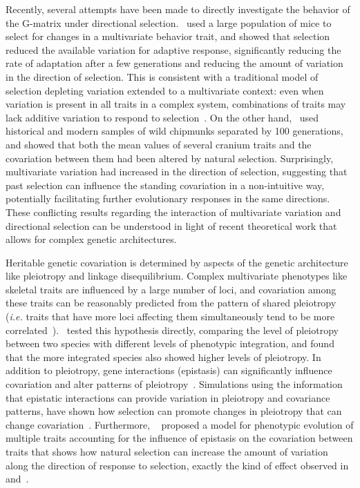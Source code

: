 \begin{refsection}
Recently, several attempts have been made to directly investigate the
behavior of the G-matrix under directional selection.~\textcite{Careau2015-sy} used a
large population of mice to select for changes in a multivariate
behavior trait, and showed that selection reduced the available
variation for adaptive response, significantly reducing the rate of
adaptation after a few generations and reducing the amount of variation
in the direction of selection. This is consistent with a traditional
model of selection depleting variation extended to a multivariate
context: even when variation is present in all traits in a complex
system, combinations of traits may lack additive variation to respond to
selection~\parencite{Hine2011-ks}. On the other hand,~\textcite{Assis2016-vz} used historical
and modern samples of wild chipmunks separated by 100 generations, and
showed that both the mean values of several cranium traits and the
covariation between them had been altered by natural selection.
Surprisingly, multivariate variation had increased in the direction of
selection, suggesting that past selection can influence the standing
covariation in a non-intuitive way, potentially facilitating further
evolutionary responses in the same directions. These conflicting results
regarding the interaction of multivariate variation and directional
selection can be understood in light of recent theoretical work that
allows for complex genetic architectures.

Heritable genetic covariation is determined by aspects of the genetic
architecture like pleiotropy and linkage disequilibrium. Complex
multivariate phenotypes like skeletal traits are influenced by a large
number of loci, and covariation among these traits can be reasonably
predicted from the pattern of shared pleiotropy (\emph{i.e.} traits
that have more loci affecting them simultaneously tend to be more
correlated~\parencite{Kenney-Hunt2008-bd}).~\textcite{Porto2016-qc} tested this hypothesis
directly, comparing the level of pleiotropy between two species with
different levels of phenotypic integration, and found that the more
integrated species also showed higher levels of pleiotropy. In addition
to pleiotropy, gene interactions (epistasis) can significantly influence
covariation and alter patterns of
pleiotropy~\parencite{Wolf2005-nr, Wolf2006-xt, Pavlicev2008-jy}. Simulations using
the information that epistatic interactions can provide variation in
pleiotropy and covariance patterns, have shown how selection can promote
changes in pleiotropy that can change
covariation~\parencite{Jones2014-wj, Melo2015-bk}. Furthermore, ~\textcite{Pavlicev2011-wz}
proposed a model for phenotypic evolution of multiple traits accounting
for the influence of epistasis on the covariation between traits that
shows how natural selection can increase the amount of variation along
the direction of response to selection, exactly the kind of effect
observed in~\textcite{Assis2016-vz} and~\textcite{Roff2012-fe}.


\end{refsection}

